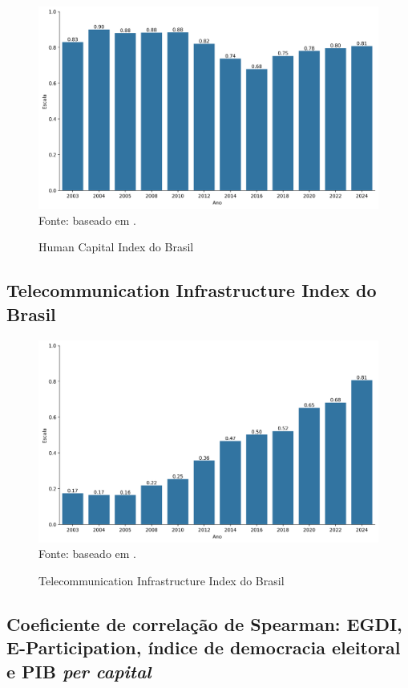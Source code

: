 \begin{figure}[H]
	\centering
	\caption{Human Capital Index do Brasil}
	\includegraphics[width=1\linewidth]{figuras/egdi/egdi_brasil_hci.png}
	\label{fig:egdi_brasil_hci}
	\footnotesize{Fonte: baseado em \cite{ONU_EGDI_mapa}.}
\end{figure}

\subsection{Telecommunication Infrastructure Index do Brasil}

\begin{figure}[H]
	\centering
	\caption{Telecommunication Infrastructure Index do Brasil}
	\includegraphics[width=1\linewidth]{figuras/egdi/egdi_brasil_tsi.png}
	\label{fig:egdi_brasil_tsi}
	\footnotesize{Fonte: baseado em \cite{ONU_EGDI_mapa}.}
\end{figure}

\subsection{Coeficiente de correlação de Spearman: EGDI, E-Participation, índice de democracia eleitoral e PIB \textit{per capital}}

